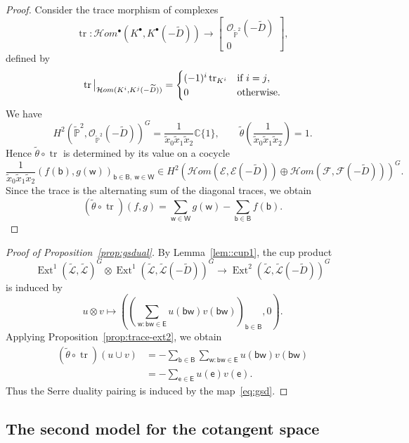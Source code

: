 \documentclass[dvipsnames,11pt]{article}
\theoremstyle{definition}
\newcommand{\C}{{\mathbb C}}
\renewcommand{\P}{{\mathbb P}}
\def\B{\mathsf B}
\def\W{\mathsf W}
\def\w{\mathsf w}
\def\b{\mathsf b}
\def\e{\mathsf e}
\def\E{\mathsf E}
\def\Ext{\operatorname{Ext}}
\def\cale{\mathcal E}
\def\calf{\mathcal F}
\newcommand\restr[2]{{
  \left.\kern-\nulldelimiterspace 
  #1 
  \vphantom{\big|} 
  \right|_{#2} 
  }}
\def\Ext{\operatorname{Ext}}
\DeclareMathOperator{\tr}{tr}
\begin{document}
\begin{proof}
Consider the trace morphism of complexes
\[
\tr:\mathcal H om^\bullet(K^\bullet,K^\bullet(-\widetilde D)) \rightarrow
\left[
\begin{array}{c}
\mathcal O_{\widetilde\P^2}(-\widetilde D)\\[-.4ex]
{\scriptstyle 0}
\end{array}
\right],
\]
defined by
\[
\restr{\tr}{\mathcal H om(K^i,K^j(-\widetilde D))}
=
\begin{cases}
(-1)^i\tr_{K^i} & \text{if $i=j$},\\
0 & \text{otherwise}.
\end{cases}
\]
We have
\[
H^2(\widetilde\P^2,\mathcal O_{\widetilde\P^2}(-\widetilde D))^G
=
\frac{1}{\widetilde x_0 \widetilde x_1 \widetilde x_2}\C\{1\},
\qquad
\widetilde \theta \left(\frac{1}{\widetilde x_0 \widetilde x_1 \widetilde x_2}\right)=1.
\]
Hence \(\widetilde\theta\circ\tr\) is determined by its value on a cocycle
\[
\frac{1}{\widetilde x_0 \widetilde x_1 \widetilde x_2}(f(\b),g(\w))_{\b\in\B,\ \w\in\W}\in H^2(\mathcal H om(\cale,\cale(-\widetilde D))\oplus \mathcal H om(\calf,\calf(-\widetilde D)))^G.
\]
Since the trace is the alternating sum of the diagonal traces, we obtain
\[
(\widetilde\theta\circ\tr)(f,g)
=
\sum_{\w\in\W}g(\w)-\sum_{\b\in\B}f(\b).
\]
\end{proof}

\begin{proof}[Proof of Proposition~\ref{prop:gsdual}]
By Lemma~\ref{lem::cup1}, the cup product
\[
\Ext^1(\widetilde{\mathcal L},\widetilde{\mathcal L})^G \otimes
\Ext^1(\widetilde{\mathcal L},\widetilde{\mathcal L}(-\widetilde D))^G
\rightarrow
\Ext^2(\widetilde{\mathcal L},\widetilde{\mathcal L}(-\widetilde D))^G
\]
is induced by
\[
u\otimes v\mapsto
\left(
\left(\sum_{\w:\b\w\in \E}u(\b\w)v(\b\w)\right)_{\b\in \B},
0
\right).
\]
Applying Proposition~\ref{prop:trace-ext2}, we obtain
\begin{align*}
(\widetilde\theta\circ\tr)(u\cup v)
&=
-\sum_{\b\in\B}\sum_{\w:\b\w\in \E}u(\b\w)v(\b\w)\\
&=
-\sum_{\e\in\E}u(\e)v(\e).
\end{align*}
Thus the Serre duality pairing is induced by the map~\eqref{eq:gsd}.
\end{proof}

\subsection{The second model for the cotangent space}\label{sec:ext-ld}
\end{document}
